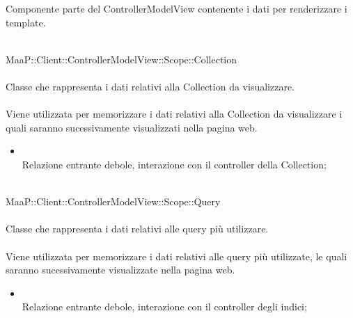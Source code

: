 Componente parte del ControllerModelView contenente i dati per renderizzare i template.

\\
MaaP::Client::ControllerModelView::Scope::Collection\\
\\
Classe che rappresenta i dati relativi alla Collection da visualizzare.\\
\\
Viene utilizzata per memorizzare i dati relativi alla Collection da visualizzare i quali saranno sucessivamente visualizzati nella pagina web.\\
\begin{itemize}
\item{}\\
Relazione entrante debole, interazione con il controller della Collection;
\end{itemize}

\\
MaaP::Client::ControllerModelView::Scope::Query\\
\\
Classe che rappresenta i dati relativi alle query più utilizzare.\\
\\
Viene utilizzata per memorizzare i dati relativi alle query più utilizzate, le quali saranno sucessivamente visualizzate nella pagina web.\\
\begin{itemize}
\item{}\\
Relazione entrante debole, interazione con il controller degli indici;
\end{itemize}

